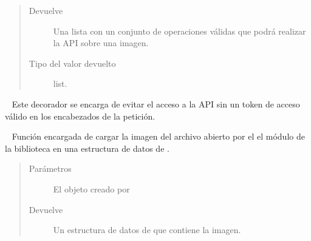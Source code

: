 \begin{fulllineitems}
\begin{fulllineitems}
\begin{quote}
\begin{description}
\item[{Devuelve}] \leavevmode
Una lista con un conjunto de operaciones válidas que podrá realizar la API sobre una imagen.

\item[{Tipo del valor devuelto}] \leavevmode
list.

\end{description}\end{quote}

\end{fulllineitems}


\begin{fulllineitems}
\label{\detokenize{chapter_two/desc_cloudnao:app.utils.auxiliar_functions.require_api_key}}~
Este decorador se encarga de evitar el acceso a la API sin un token de acceso
válido en los encabezados de la petición.

\end{fulllineitems}


\begin{fulllineitems}
\label{\detokenize{chapter_two/desc_cloudnao:app.utils.image_utils.load_image_into_numpy_array}}~
Función encargada de cargar la imagen del archivo abierto por el el módulo
 de la biblioteca  en una estructura de datos de .
\begin{quote}\begin{description}
\item[{Parámetros}] \leavevmode
{} \textendash{} El objeto creado por 

\item[{Devuelve}] \leavevmode
Un estructura de datos  de  que contiene la imagen.

\end{description}\end{quote}

\end{fulllineitems}




\end{fulllineitems}
